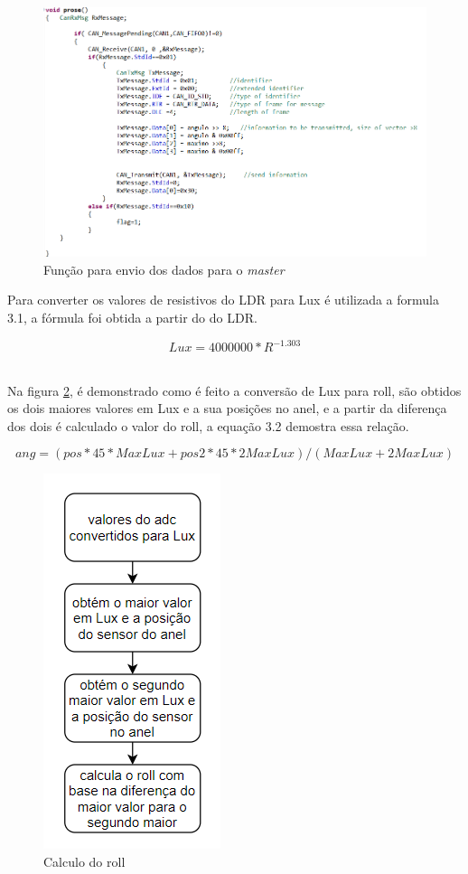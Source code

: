 \newpage
\begin{figure}[!htb]
\centering
\includegraphics[scale=0.7]{Figuras/can.PNG}
\caption{Função para envio dos dados para o \textit{master}}
\label{can}
\end{figure}

Para converter os valores de resistivos do LDR para Lux é utilizada a formula 3.1, a fórmula foi obtida a partir do  do LDR.

\begin{equation} 
    {Lux=4000000*R^{-1.303}}
\end{equation}


\\Na figura \ref{roll}, é demonstrado como é feito a conversão de Lux para roll, são obtidos os dois maiores valores em Lux e a sua posições no anel, e a partir da diferença dos dois é calculado o valor do roll, a equação 3.2 demostra essa relação.

\begin{equation} 
    {ang=(pos*45*MaxLux+pos2*45*2MaxLux)/(MaxLux+2MaxLux)}
\end{equation}

\newpage
\begin{figure}[!htb]
\centering
\includegraphics[scale=0.7]{Figuras/roll.PNG}
\caption{Calculo do roll}
\label{roll}
\end{figure}


